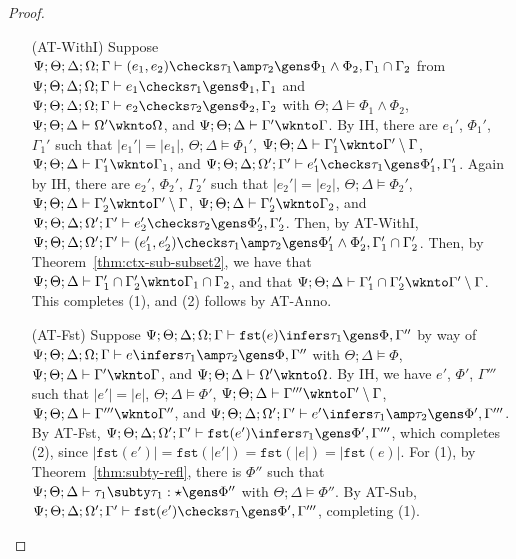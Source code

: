 \begin{proof}
\begin{itemize}
 
 \item[(AT-WithI)] Suppose $\Psi ; \Theta ; \Delta ; \Omega ; \Gamma \vdash (e_1,e_2) \checks \tau_1 \amp \tau_2 \gens \Phi_1 \wedge \Phi_2, \Gamma_1 \cap \Gamma_2$
 from $\Psi ; \Theta ; \Delta ; \Omega ; \Gamma \vdash e_1 \checks \tau_1 \gens \Phi_1, \Gamma_1$ and 
 $\Psi ; \Theta ; \Delta ; \Omega ; \Gamma \vdash e_2 \checks \tau_2 \gens \Phi_2, \Gamma_2$ with 
 $\Theta ; \Delta \vDash \Phi_1 \wedge \Phi_2$,
 $\Psi ; \Theta ; \Delta \vdash \Omega' \wknto \Omega$, and
 $\Psi ; \Theta ; \Delta \vdash \Gamma' \wknto \Gamma$.
 By IH, there are $e_1'$, $\Phi_1'$, $\Gamma_1'$ such that
 $|e_1'| = |e_1|$,
 $\Theta ; \Delta \vDash \Phi_1'$,
 $\Psi ; \Theta ; \Delta \vdash \Gamma_1' \wknto \Gamma' \setminus \Gamma$,
 $\Psi ; \Theta ; \Delta \vdash \Gamma_1' \wknto \Gamma_1$, and
 $\Psi ; \Theta ; \Delta ; \Omega' ; \Gamma' \vdash e_1' \checks \tau_1 \gens \Phi_1', \Gamma_1'$.
 Again by IH, there are $e_2'$, $\Phi_2'$, $\Gamma_2'$ such that
 $|e_2'| = |e_2|$,
 $\Theta ; \Delta \vDash \Phi_2'$,
 $\Psi ; \Theta ; \Delta \vdash \Gamma_2' \wknto \Gamma' \setminus \Gamma$,
 $\Psi ; \Theta ; \Delta \vdash \Gamma_2' \wknto \Gamma_2$, and
 $\Psi ; \Theta ; \Delta ; \Omega' ; \Gamma' \vdash e_2' \checks \tau_2 \gens \Phi_2', \Gamma_2'$.
 Then, by AT-WithI, 
 $\Psi ; \Theta ; \Delta ; \Omega' ; \Gamma' \vdash (e_1',e_2') \checks \tau_1 \amp \tau_2 \gens \Phi_1' \wedge \Phi_2', \Gamma_1' \cap \Gamma_2'$.
 Then, by Theorem~\ref{thm:ctx-sub-subset2}, we have that $\Psi ; \Theta ; \Delta \vdash \Gamma_1' \cap \Gamma_2' \wknto \Gamma_1 \cap \Gamma_2$,
 and that $\Psi ; \Theta ; \Delta \vdash \Gamma_1' \cap \Gamma_2' \wknto \Gamma' \setminus \Gamma$. This completes (1), and (2) follows by AT-Anno.
  
  
  \item[(AT-Fst)] Suppose $\Psi ; \Theta ; \Delta ; \Omega ; \Gamma \vdash \texttt{fst}(e) \infers \tau_1 \gens \Phi,\Gamma''$ by way of
  $\Psi ; \Theta ; \Delta ; \Omega ; \Gamma \vdash e \infers \tau_1 \amp \tau_2 \gens \Phi,\Gamma''$
  with $\Theta ; \Delta \vDash \Phi$,
  $\Psi ; \Theta ; \Delta \vdash \Gamma' \wknto \Gamma$, and
  $\Psi ; \Theta ; \Delta \vdash \Omega' \wknto \Omega$.
  By IH, we have $e'$, $\Phi'$, $\Gamma'''$ such that
  $|e'| = |e|$,
  $\Theta ; \Delta \vDash \Phi'$,
  $\Psi ; \Theta ; \Delta \vdash \Gamma''' \wknto \Gamma' \setminus \Gamma$,
  $\Psi ; \Theta ; \Delta \vdash \Gamma''' \wknto \Gamma''$, and
  $\Psi ; \Theta ; \Delta ; \Omega' ; \Gamma' \vdash e' \infers \tau_1 \amp \tau_2 \gens \Phi',\Gamma'''$.
  By AT-Fst, $\Psi ; \Theta ; \Delta ; \Omega' ; \Gamma' \vdash \texttt{fst}(e') \infers \tau_1 \gens \Phi',\Gamma'''$,
  which completes (2), since $|\texttt{fst}(e')| = \texttt{fst}(|e'|) = \texttt{fst}(|e|) = |\texttt{fst}(e)|$. For (1),
  by Theorem~\ref{thm:subty-refl}, there is $\Phi''$ such that $\Psi ; \Theta ; \Delta \vdash \tau_1 \subty \tau_1 : \star \gens \Phi''$ with $\Theta ; \Delta \vDash \Phi''$. By AT-Sub, $\Psi ; \Theta ; \Delta ; \Omega' ; \Gamma' \vdash \texttt{fst}(e') \checks \tau_1 \gens \Phi',\Gamma'''$, completing (1).


\end{itemize}
\end{proof}
